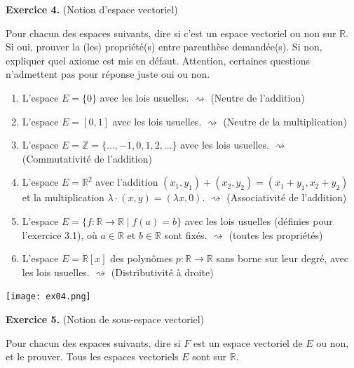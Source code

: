 \documentclass[a4paper, 10pt]{report}
\begin{document}
	\vspace{5mm}
	\noindent
	\textbf{Exercice 4.} (Notion d'espace vectoriel)
	
	\indent Pour chacun des espaces suivants, dire si c'est un espace
	vectoriel ou non sur $\mathbb{R}$. Si oui, prouver la (les)
	propriété(s) entre parenthèse demandée(s). Si non, expliquer quel
	axiome est mis en défaut. Attention, certaines questions
	n'admettent pas pour réponse juste oui ou non.
	
	\begin{enumerate}[label=\arabic*.]
		\item L'espace $E = \{0\}$ avec les lois usuelles.
			$\rightsquigarrow$ (Neutre de l'addition)
		\item L'espace $E = [0, 1]$ avec les lois usuelles.
			$\rightsquigarrow$ (Neutre de la multiplication)
		\item L'espace $E = \mathbb{Z} = \{..., -1, 0, 1, 2, ...\}$
		avec les lois usuelles.
			$\rightsquigarrow$ (Commutativité de l'addition)
		\item L'espace $E = \mathbb{R}^2$ avec
		l'addition $(x_1, y_1) + (x_2, y_2) = (x_1 + y_1, x_2 + y_2)$ et
		la multiplication $\lambda \cdot (x, y) = (\lambda x, 0)$.
			$\rightsquigarrow$ (Associativité de l'addition)
		\item L'espace $E = \{f : \mathbb{R} \rightarrow \mathbb{R} \mid f(a) = b\}$
		avec les lois usuelles (définies pour l'exercice 3.1),
		où $a \in \mathbb{R}$ et $b \in \mathbb{R}$ sont fixés.
			$\rightsquigarrow$ (toutes les propriétés)
		\item L'espace $E = \mathbb{R}[x]$ des polynômes
		$p : \mathbb{R} \rightarrow \mathbb{R}$ sans borne sur leur degré,
		avec les lois usuelles.
			$\rightsquigarrow$ (Distributivité à droite)
	\end{enumerate}
	
	
	\texttt{[image: ex04.png]}

	\newpage
	\vspace{5mm}
	\noindent
	\textbf{Exercice 5.} (Notion de sous-espace vectoriel)
	
	\indent Pour chacun des espaces suivants, dire si $F$ est un espace
	vectoriel de $E$ ou non, et le prouver. Tous les espaces vectoriels
	$E$ sont sur $\mathbb{R}$.
	
\end{document}
